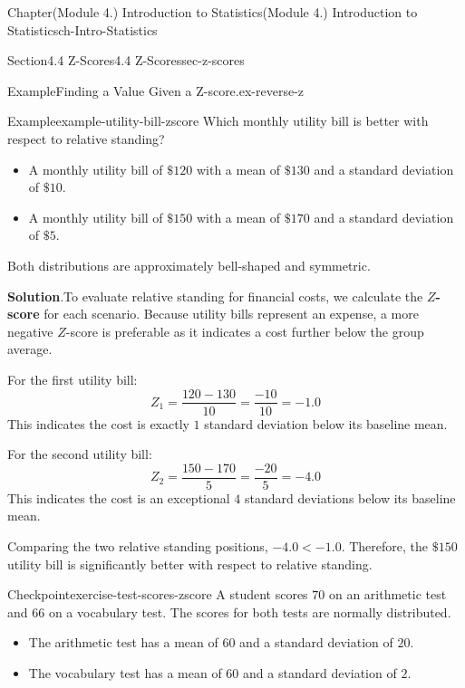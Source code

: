 \documentclass[oneside,10pt,]{book}
\newcommand{\blocktitlefont}{\relax}
\newcommand{\ptxlistdisc}{\raisebox{0.3ex}{\textbullet}}
\newcommand{\terminology}[1]{\textbf{#1}}
\newcommand{\lt}{<}
\begin{document}
\begin{chapterptx}{Chapter}{(Module 4.) Introduction to Statistics}{}{(Module 4.) Introduction to Statistics}{}{}{ch-Intro-Statistics}
\begin{sectionptx}{Section}{4.4 Z-Scores}{}{4.4 Z-Scores}{}{}{sec-z-scores}
\begin{example}{Example}{Finding a Value Given a Z-score.}{ex-reverse-z}
%
\end{example}
\begin{example}{Example}{}{example-utility-bill-zscore}%
Which monthly utility bill is better with respect to relative standing?%
\begin{itemize}[label=\ptxlistdisc]
\item{}A monthly utility bill of \(\$120\) with a mean of \(\$130\) and a standard deviation of \(\$10\).%
\item{}A monthly utility bill of \(\$150\) with a mean of \(\$170\) and a standard deviation of \(\$5\).%
\end{itemize}
Both distributions are approximately bell-shaped and symmetric.%
\par\smallskip%
\noindent\textbf{\blocktitlefont Solution}.\hypertarget{example-utility-bill-zscore-2}{}\quad{}To evaluate relative standing for financial costs, we calculate the \terminology{\(Z\)-score} for each scenario. Because utility bills represent an expense, a more negative \(Z\)-score is preferable as it indicates a cost further below the group average.%
\par
For the first utility bill:%
\begin{equation*}
Z_1 = \frac{120 - 130}{10} = \frac{-10}{10} = -1.0
\end{equation*}
This indicates the cost is exactly \(1\) standard deviation below its baseline mean.%
\par
For the second utility bill:%
\begin{equation*}
Z_2 = \frac{150 - 170}{5} = \frac{-20}{5} = -4.0
\end{equation*}
This indicates the cost is an exceptional \(4\) standard deviations below its baseline mean.%
\par
Comparing the two relative standing positions, \(-4.0 \lt -1.0\). Therefore, the \(\$150\) utility bill is significantly better with respect to relative standing.%
\end{example}
\begin{inlineexercise}{Checkpoint}{}{exercise-test-scores-zscore}%
A student scores \(70\) on an arithmetic test and \(66\) on a vocabulary test. The scores for both tests are normally distributed.%
\begin{itemize}[label=\ptxlistdisc]
\item{}The arithmetic test has a mean of \(60\) and a standard deviation of \(20\).%
\item{}The vocabulary test has a mean of \(60\) and a standard deviation of \(2\).%

\end{itemize}
\end{inlineexercise}
\end{sectionptx}
\end{chapterptx}
\end{document}
